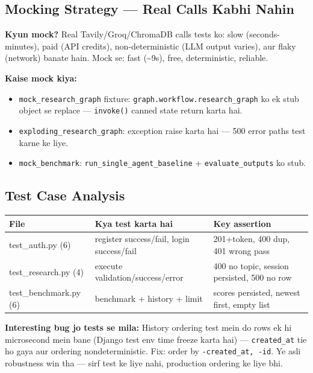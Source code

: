 \subsection{Mocking Strategy --- Real Calls Kabhi Nahin}

\begin{conceptbox}
\textbf{Kyun mock?} Real Tavily/Groq/ChromaDB calls tests ko: slow (seconds-minutes), paid (API credits), non-deterministic (LLM output varies), aur flaky (network) banate hain. Mock se: fast (\textasciitilde9s), free, deterministic, reliable.

\textbf{Kaise mock kiya:}
\begin{itemize}
\item \texttt{mock\_research\_graph} fixture: \texttt{graph.workflow.research\_graph} ko ek stub object se replace --- \texttt{invoke()} canned state return karta hai.
\item \texttt{exploding\_research\_graph}: exception raise karta hai --- 500 error paths test karne ke liye.
\item \texttt{mock\_benchmark}: \texttt{run\_single\_agent\_baseline} + \texttt{evaluate\_outputs} ko stub.
\end{itemize}
\end{conceptbox}

\subsection{Test Case Analysis}

\begin{longtable}{p{2.2cm} p{5.6cm} p{5.8cm}}
\toprule
\textbf{File} & \textbf{Kya test karta hai} & \textbf{Key assertion} \\
\midrule
test\_auth.py (6) & register success/fail, login success/fail & 201+token, 400 dup, 401 wrong pass \\
test\_research.py (4) & execute validation/success/error & 400 no topic, session persisted, 500 no row \\
test\_benchmark.py (6) & benchmark + history + limit & scores persisted, newest first, empty list \\
\bottomrule
\end{longtable}

\begin{interviewbox}
\textbf{Interesting bug jo tests se mila:} History ordering test mein do rows ek hi microsecond mein bane (Django test env time freeze karta hai) --- \texttt{created\_at} tie ho gaya aur ordering nondeterministic. Fix: order by \texttt{-created\_at, -id}. Ye asli robustness win tha --- sirf test ke liye nahi, production ordering ke liye bhi.
\end{interviewbox}

